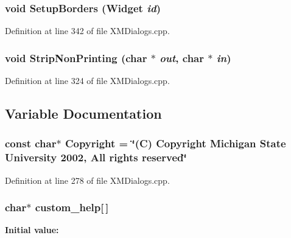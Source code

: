\subsubsection{\setlength{\rightskip}{0pt plus 5cm}void Setup\-Borders (Widget {\em id})\hspace{0.3cm}{\tt  [static]}}\label{XMDialogs_8cpp_a7}




Definition at line 342 of file XMDialogs.cpp.
\subsubsection{\setlength{\rightskip}{0pt plus 5cm}void Strip\-Non\-Printing (char $\ast$ {\em out}, char $\ast$ {\em in})\hspace{0.3cm}{\tt  [static]}}\label{XMDialogs_8cpp_a6}




Definition at line 324 of file XMDialogs.cpp.

\subsection{Variable Documentation}
\subsubsection{\setlength{\rightskip}{0pt plus 5cm}const char$\ast$ Copyright = \char`\"{}(C) Copyright Michigan State University 2002, All rights reserved\char`\"{}\hspace{0.3cm}{\tt  [static]}}\label{XMDialogs_8cpp_a0}




Definition at line 278 of file XMDialogs.cpp.
\subsubsection{\setlength{\rightskip}{0pt plus 5cm}char$\ast$ custom\_\-help[$\,$]\hspace{0.3cm}{\tt  [static]}}\label{XMDialogs_8cpp_a5}


{\bf Initial value:}

